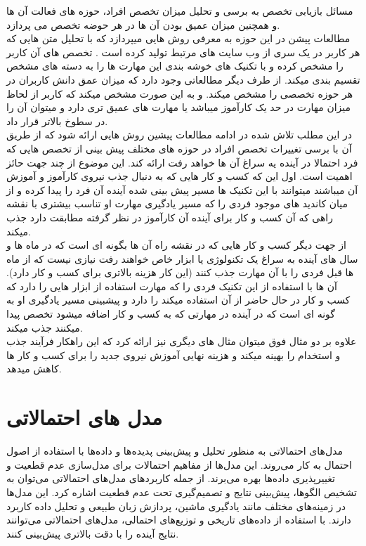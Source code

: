 مسائل بازیابی تخصص به برسی و تحلیل میزان تخصص افراد، حوزه های فعالت آن ها و همچنین میزان عمیق بودن آن ها در هر حوضه تخصص می پردازد.
\\
مطالعات پیشن در این حوزه به معرفی روش هایی میپردازد که با تحلیل متن هایی که هر کاربر در یک سری از وب سایت های مرتبط تولید کرده است . تخصص های آن کاربر را مشخص کرده و با تکنیک های خوشه بندی این مهارت ها را به دسته های مشخص تقسیم بندی میکند.
از طرف دیگر مطالعاتی وجود دارد که میزان عمق دانش کاربران در هر حوزه تخصصی را مشخص میکند. و به این صورت مشخص میکند که کاربر از لحاظ میزان مهارت در حد یک کارآموز میباشد یا مهارت های عمیق تری دارد و میتوان آن را در سطوخ بالاتر قرار داد.
\\
در این مطلب تلاش شده در ادامه مطالعات پیشین روش هایی ارائه شود که از طریق آن با برسی تغییرات تخصص افراد در حوزه های مختلف پیش بینی از تخصص هایی که فرد احتمالا در آینده یه سراغ آن ها خواهد رفت ارائه کند.
این موضوع از چند جهت حائز اهمیت است. اول این که کسب و کار هایی که به دنبال جذب نیروی کارآموز و آموزش آن میباشند میتوانند با این تکنیک ها مسیر پیش بینی شده آینده آن فرد را پیدا کرده و از میان کاندید های موجود فردی را که مسیر یادگیری مهارت او تناسب بیشتری با نقشه راهی که آن کسب و کار برای آینده آن کارآموز در نظر گرفته مطابقت دارد جذب میکند.
\\
از جهت دیگر کسب و کار هایی که در نقشه راه آن ها بگونه ای است که در ماه ها و سال های آینده به سراغ یک تکنولوژی یا ابزار خاص خواهند رفت نیازی نیست که از ماه ها قبل فردی را با آن مهارت جذب کنند (این کار هزینه بالاتری برای کسب و کار دارد).  آن ها با استفاده از این تکنیک فردی را که مهارت استفاده از ابزار هایی را دارد که کسب و کار در حال حاضر از آن استفاده میکند را دارد و پیشبینی مسیر یادگیری او به گونه ای است که در آینده در مهارتی که به کسب و کار اضافه میشود تخصص پیدا میکنند جذب میکند.
\\
علاوه بر دو مثال فوق میتوان مثال های دیگری نیز ارائه کرد که این راهکار فرآیند جذب و استخدام را بهینه میکند و هزینه نهایی آموزش نیروی جدید را برای کسب و کار ها کاهش میدهد.




\section{مدل های احتمالاتی}
\hspace*{2em}
مدل‌های احتمالاتی به منظور تحلیل و پیش‌بینی پدیده‌ها و داده‌ها با استفاده از اصول احتمال به	 کار می‌روند. این مدل‌ها از مفاهیم احتمالات برای مدل‌سازی عدم قطعیت و تغییرپذیری داده‌ها بهره می‌برند. از جمله کاربردهای مدل‌های احتمالاتی می‌توان به تشخیص الگوها، پیش‌بینی نتایج و تصمیم‌گیری تحت عدم قطعیت اشاره کرد. این مدل‌ها در زمینه‌های مختلف مانند یادگیری ماشین، پردازش زبان طبیعی و تحلیل داده کاربرد دارند. با استفاده از داده‌های تاریخی و توزیع‌های احتمالی، مدل‌های احتمالاتی می‌توانند نتایج آینده را با دقت بالاتری پیش‌بینی کنند.

